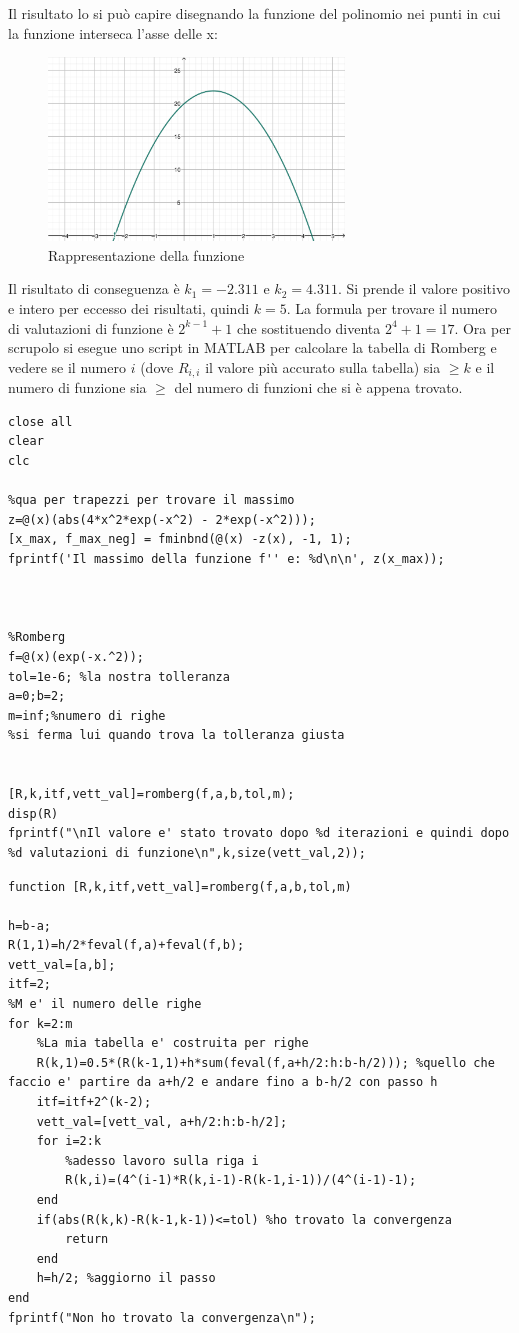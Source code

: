 \documentclass[11pt]{article}
\begin{document}
Il risultato lo si può capire disegnando la funzione del polinomio nei punti in cui la funzione interseca l'asse delle x:
\begin{figure}[H]
  \centering
  \includegraphics[width=0.7\textwidth]{images/polinomio.png} 
  \caption{Rappresentazione della funzione}
  \label{fig:funzione}
\end{figure}
Il risultato di conseguenza è $k_1=-2.311$ e $k_2=4.311$. Si prende il valore positivo e intero per eccesso dei risultati, quindi $k=5$.
La formula per trovare il numero di valutazioni di funzione è $2^{k-1} + 1$ che sostituendo diventa $2^{4} + 1=17$. Ora per scrupolo si esegue uno script in MATLAB per calcolare la tabella di Romberg e vedere se il numero $i$ (dove $R_{i,i}$ il valore più accurato sulla tabella) sia $\geq k$ e il numero di funzione sia $\geq$ del numero di funzioni che si è appena trovato.
\begin{lstlisting}
close all
clear
clc

%qua per trapezzi per trovare il massimo 
z=@(x)(abs(4*x^2*exp(-x^2) - 2*exp(-x^2)));
[x_max, f_max_neg] = fminbnd(@(x) -z(x), -1, 1);
fprintf('Il massimo della funzione f'' e: %d\n\n', z(x_max));



%Romberg
f=@(x)(exp(-x.^2));
tol=1e-6; %la nostra tolleranza
a=0;b=2;
m=inf;%numero di righe
%si ferma lui quando trova la tolleranza giusta


[R,k,itf,vett_val]=romberg(f,a,b,tol,m);
disp(R)
fprintf("\nIl valore e' stato trovato dopo %d iterazioni e quindi dopo %d valutazioni di funzione\n",k,size(vett_val,2));

\end{lstlisting}
\begin{lstlisting}
function [R,k,itf,vett_val]=romberg(f,a,b,tol,m)

h=b-a;
R(1,1)=h/2*feval(f,a)+feval(f,b);
vett_val=[a,b];
itf=2;
%M e' il numero delle righe
for k=2:m
    %La mia tabella e' costruita per righe
    R(k,1)=0.5*(R(k-1,1)+h*sum(feval(f,a+h/2:h:b-h/2))); %quello che faccio e' partire da a+h/2 e andare fino a b-h/2 con passo h 
    itf=itf+2^(k-2);
    vett_val=[vett_val, a+h/2:h:b-h/2];
    for i=2:k
        %adesso lavoro sulla riga i
        R(k,i)=(4^(i-1)*R(k,i-1)-R(k-1,i-1))/(4^(i-1)-1);
    end
    if(abs(R(k,k)-R(k-1,k-1))<=tol) %ho trovato la convergenza
        return
    end
    h=h/2; %aggiorno il passo
end
fprintf("Non ho trovato la convergenza\n");
\end{lstlisting}
\end{document}
